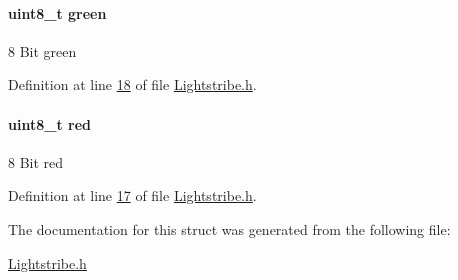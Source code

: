 \hypertarget{structcolor24bit_a90d21fa503b626c00cdc8d94863d5877}{}
\paragraph[{green}]{\setlength{\rightskip}{0pt plus 5cm}uint8\+\_\+t green}\label{structcolor24bit_a90d21fa503b626c00cdc8d94863d5877}
8 Bit green 

Definition at line \hyperlink{_lightstribe_8h_source_l00018}{18} of file \hyperlink{_lightstribe_8h_source}{Lightstribe.\+h}.

\hypertarget{structcolor24bit_ad47d918910aaa51c73160ac85999d09c}{}
\paragraph[{red}]{\setlength{\rightskip}{0pt plus 5cm}uint8\+\_\+t red}\label{structcolor24bit_ad47d918910aaa51c73160ac85999d09c}
8 Bit red 

Definition at line \hyperlink{_lightstribe_8h_source_l00017}{17} of file \hyperlink{_lightstribe_8h_source}{Lightstribe.\+h}.



The documentation for this struct was generated from the following file\+:\begin{DoxyCompactItemize}
\item 
\hyperlink{_lightstribe_8h}{Lightstribe.\+h}\end{DoxyCompactItemize}
